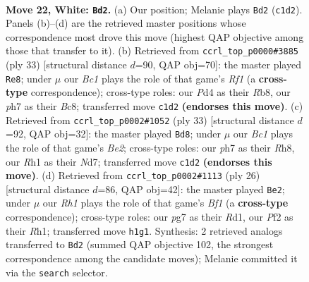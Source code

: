 \documentclass[11pt]{article}
\begin{document}
\clearpage

\begin{figure}[p]\centering
\begin{subfigure}{0.46\textwidth}\centering
\resizebox{\linewidth}{!}{%
\newchessgame
\chessboard[
  setfen={rk3b1r/pp4pp/2p1b3/q2p1p2/P2P3P/1Q2PN2/1PK2PP1/1RB4R w - - 1 22},
  showmover=false,
  pgfstyle=straightmove, color=movearrow, markmove={c1-d2}
]}
\caption{}
\end{subfigure}\hfill
\begin{subfigure}{0.46\textwidth}\centering
\resizebox{\linewidth}{!}{%
\newchessgame
\chessboard[
  setfen={1rb2rk1/ppp2ppp/1bp3q1/8/Q3P3/2PB1NP1/PP4PP/1K1R3R b - - 0 17},
  showmover=false,
  pgfstyle=straightmove, color=movearrow, markmove={f8-e8}
]}
\caption{}
\end{subfigure}
\\[4pt]
\begin{subfigure}{0.46\textwidth}\centering
\resizebox{\linewidth}{!}{%
\newchessgame
\chessboard[
  setfen={1r2k2r/1p1nbpp1/p2p1q2/N2Pp2p/2P5/3Q1P2/PP3BPP/R4RK1 b k - 2 17},
  showmover=false,
  pgfstyle=straightmove, color=movearrow, markmove={e7-d8}
]}
\caption{}
\end{subfigure}\hfill
\begin{subfigure}{0.46\textwidth}\centering
\resizebox{\linewidth}{!}{%
\newchessgame
\chessboard[
  setfen={2r1kb1r/pp1bpp2/3p1p2/2q4p/4PP2/2NQ4/PPP3PP/1K1R1B1R w k - 0 14},
  showmover=false,
  pgfstyle=straightmove, color=movearrow, markmove={f1-e2}
]}
\caption{}
\end{subfigure}
\caption{\textbf{Move 22, White: \texttt{Bd2}.} (a) Our position; Melanie plays \texttt{Bd2} (\texttt{c1d2}). Panels (b)--(d) are the retrieved master positions whose correspondence most drove this move (highest QAP objective among those that transfer to it). (b) Retrieved from \texttt{ccrl\_top\_p0000\#3885} (ply 33) [structural distance $d$=90, QAP obj=70]: the master played \texttt{Re8}; under $\mu$ our \emph{Bc1} plays the role of that game's \emph{Rf1} (a \textbf{cross-type} correspondence); cross-type roles: our \emph{P}d4 as their \emph{R}b8, our \emph{p}h7 as their \emph{B}c8; transferred move \texttt{c1d2} \textbf{(endorses this move)}. (c) Retrieved from \texttt{ccrl\_top\_p0002\#1052} (ply 33) [structural distance $d$=92, QAP obj=32]: the master played \texttt{Bd8}; under $\mu$ our \emph{Bc1} plays the role of that game's \emph{Be2}; cross-type roles: our \emph{p}h7 as their \emph{R}h8, our \emph{R}h1 as their \emph{N}d7; transferred move \texttt{c1d2} \textbf{(endorses this move)}. (d) Retrieved from \texttt{ccrl\_top\_p0002\#1113} (ply 26) [structural distance $d$=86, QAP obj=42]: the master played \texttt{Be2}; under $\mu$ our \emph{Rh1} plays the role of that game's \emph{Bf1} (a \textbf{cross-type} correspondence); cross-type roles: our \emph{p}g7 as their \emph{R}d1, our \emph{P}f2 as their \emph{R}h1; transferred move \texttt{h1g1}. Synthesis: 2 retrieved analogs transferred to \texttt{Bd2} (summed QAP objective 102, the strongest correspondence among the candidate moves); Melanie committed it via the \texttt{search} selector.}
\label{fig:thought-m42}
\end{figure}
\end{document}
